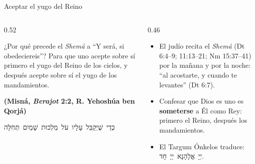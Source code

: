 \documentclass[hyperref={bookmarks=false},aspectratio=169]{beamer}
\newcommand{\heb}[1]{\mbox{\foreignlanguage{hebrew}{#1}}}
\newcommand{\fuente}[1]{\par\hfill{\upshape\bfseries\footnotesize\textcolor{azul}{#1}}}
\newcommand{\destacar}[1]{\textbf{\textcolor{azul}{#1}}}
\begin{document}
\begin{frame}{Aceptar el yugo del Reino}
\begin{columns}[t,onlytextwidth]
\begin{column}{0.52\textwidth}
\begin{cita}[colback=dorado!10!papiro,colframe=dorado!80!azul,fontupper=\scriptsize\itshape]¿Por qué precede el \emph{Shemá} a ``Y será, si obedeciereis''? Para que uno acepte sobre sí primero el yugo del Reino de los cielos, y después acepte sobre sí el yugo de los mandamientos.\fuente{(Misná, \emph{Berajot} 2:2, R. Yehoshúa ben Qorjá)}\end{cita}
\begin{center}\scriptsize\heb{כְדֵי שֶׁיְּקַבֵּל עָלָיו עֹל מַלְכוּת שָׁמַיִם תְּחִלָּה}\end{center}
\end{column}
\begin{column}{0.46\textwidth}\small
\begin{itemize}
\item El judío recita el \emph{Shemá} (Dt 6:4--9; 11:13--21; Nm 15:37--41) por la mañana y por la noche: ``al acostarte, y cuando te levantes'' (Dt 6:7).
\item Confesar que Dios es uno es \destacar{someterse} a Él como Rey: primero el Reino, después los mandamientos.
\item El Targum Ónkelos traduce: \heb{יְיָ אֱלָהָנָא יְיָ חָד}.
\end{itemize}
\end{column}
\end{columns}
\end{frame}
\end{document}
